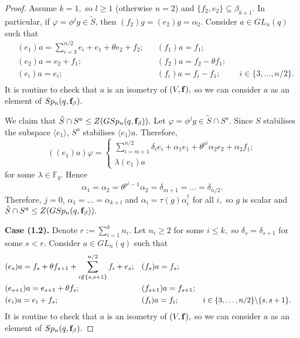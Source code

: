 \begin{proof}
Assume $k=1,$ so $l\ge 1$ (otherwise $n=2$) and $\{f_2,e_2\} \subseteq \beta_{k+1}.$ In particular, if $\varphi = \phi^j g \in \tilde{S}$, then $(f_2)g=(e_2)g=\alpha_2.$ Consider $a \in GL_n(q)$ such that
\begin{equation*}
\begin{aligned}
&(e_1)a =\sum_{i=3}^{n/2} e_i +e_1 + \theta e_2 + {f_2};& & (f_1)a=f_1; \\
&(e_{2})a =  e_2+f_1; & &(f_{2})a=f_{2} - \theta f_1; & &   \\
&(e_{i})a =e_{i};  & &(f_{i})a=f_{i} -  f_{1}; && i\in \{3, \ldots, n/2 \}.   \\
\end{aligned}
\end{equation*}
 It is routine to check that $a$ is an isometry of $(V, {\bf f}),$ so we can consider $a$ as an element of $Sp_n(q, {\bf f}_{\beta}).$

We claim that $\tilde{S} \cap S^a \le Z(GSp_n(q,{\bf f}_{\beta})).$ Let $\varphi =\phi^j g \in \tilde{S} \cap S^a$.  Since $S$ stabilises the subspace $\langle e_1 \rangle$,  $S^a$ stabilises $\langle e_1 \rangle a.$  Therefore, 
\begin{equation*}
((e_1)a)\varphi=
\begin{cases}
\sum_{i=m+1}^{n/2}\delta_i e_i +\alpha_1e_1 + \theta^{p^j} \alpha_2 e_2+ \alpha_2 f_1;\\
\lambda (e_1)a
\end{cases}
\end{equation*}
for some $\lambda \in \mathbb{F}_q.$
Hence 
$$\alpha_1=\alpha_2=\theta^{p^j-1}\alpha_2=\delta_{m+1}= \ldots= \delta_{n/2}.$$
Therefore, $j=0$,  $\alpha_1= \ldots = \alpha_{k+l}$ and $\alpha_i=\tau(g)\alpha_i^{\dagger}$ for all $i,$ so $g$ is scalar  and $\tilde{S} \cap S^a \le Z(GSp_n(q,{\bf f}_{\beta})).$

\medskip

{\bf Case (1.2).} Denote $r:= \sum_{i=1}^k n_i.$ Let $n_i \ge 2$ for some $i \le k,$ so $\delta_s= \delta_{s+1}$ for some $s<r.$ Consider $a \in GL_n(q)$ such that
\begin{equation*}
\begin{aligned}
&(e_s)a =f_s + \theta f_{s+1} + \sum_{i \notin \{s,s+1\}}^{n/2} f_i +e_s;& & (f_s)a=f_s; \\
&(e_{s+1})a =  e_{s+1}+\theta f_s; & &(f_{s+1})a=f_{s+1}; & &   \\
&(e_{i})a =e_{i} +f_s;  & &(f_{i})a=f_{i}; && \Scale[0.95]{i \in \{3, \ldots, n/2 \} \backslash \{s, s+1\}}.   \\
\end{aligned}
\end{equation*}
 It is routine to check that $a$ is an isometry of $(V, {\bf f}),$ so we can consider $a$ as an element of $Sp_n(q, {\bf f}_{\beta}).$


\end{proof}
